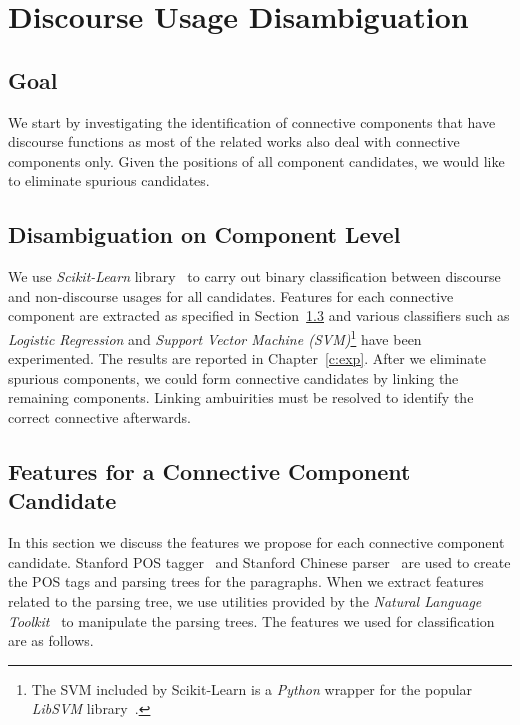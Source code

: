 

\section{Discourse Usage Disambiguation}
\label{s:discourse-disambig}

\subsection{Goal}

We start by investigating the identification of connective components that have discourse functions
as most of the related works also deal with connective components only.
Given the positions of all component candidates, we would like to eliminate spurious candidates.

\subsection{Disambiguation on Component Level}
\label{s:discourse-disambig-component}


We use \textit{Scikit-Learn} library~\citep{scikit-learn} to carry out binary
classification between discourse and non-discourse usages for all candidates.
Features for each connective component are extracted as specified in
Section~\ref{s:comp-features} and various
classifiers such as \textit{Logistic Regression} and
\textit{Support Vector Machine (SVM)}\footnote{The SVM included by Scikit-Learn is
a \textit{Python} wrapper for the popular \textit{LibSVM} library~\citep{CC01a}.}
have been experimented. The results are reported in Chapter~\ref{c:exp}. 
After we eliminate spurious components, we could form connective candidates
by linking the remaining components. Linking ambuirities must be resolved to
identify the correct connective afterwards.


\subsection{Features for a Connective Component Candidate}
\label{s:comp-features}

In this section we discuss the features we propose for each connective
component candidate.
Stanford POS tagger~\citep{toutanova2003feature} and Stanford Chinese
parser~\citep{levy2003harder} are used to create the POS tags and parsing trees
for the paragraphs. When we extract features related to the parsing tree, we use
utilities provided by the \textit{Natural Language Toolkit}~\citep{BirdKleinLoper09}
to manipulate the parsing trees. The features we used for classification
are as follows.

